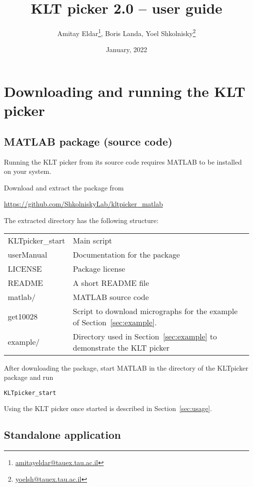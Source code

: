 \documentclass[12pt,a4paper]{article}
\title{KLT picker 2.0 --  user guide}
\author{Amitay Eldar\footnote{\protect\url{amitayeldar@tauex.tau.ac.il}}, Boris Landa, Yoel Shkolnisky\footnote{\protect\url{yoelsh@tauex.tau.ac.il}}}
\date{January, 2022}
\begin{document}
\maketitle

\section{Downloading and running the KLT picker}\label{sec:downloading}

\subsection{MATLAB package (source code)}
Running the KLT picker from its source code requires MATLAB to be installed on your system.

\bigskip

Download and extract the package from
\begin{center}
\url{https://github.com/ShkolniskyLab/kltpicker_matlab}
\end{center}

The extracted directory has the following structure:
\begin{center}
\begin{tabular}{lp{}}
\textsf{KLTpicker\_start}  & Main script \\
\textsf{userManual} & Documentation for the package \\
\textsf{LICENSE} & Package license \\
\textsf{README} & A short README file  \\
\textsf{matlab/} & MATLAB source code \\
\textsf{get10028} & Script to download micrographs for the example of Section~\ref{sec:example}. \\
\textsf{example/} & Directory used in Section~\ref{sec:example} to demonstrate the KLT picker
\end{tabular}
\end{center}

After downloading the package, start MATLAB in the directory of the KLTpicker package and run
\begin{center}
\texttt{KLTpicker\_start}
\end{center}

Using the KLT picker once started is described in Section~\ref{sec:usage}.

\subsection{Standalone application}
\end{document}
